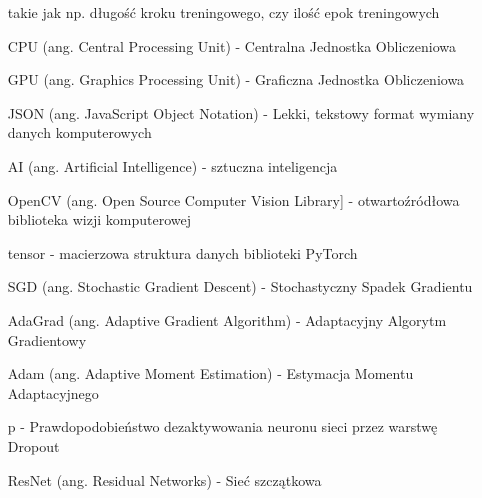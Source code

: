 \begin{itemize}
    takie jak np. długość kroku treningowego, czy ilość epok treningowych
    \item[CPU] (ang. Central Processing Unit) - Centralna Jednostka Obliczeniowa
    \item[GPU] (ang. Graphics Processing Unit) - Graficzna Jednostka Obliczeniowa
    \item[JSON] (ang. JavaScript Object Notation) - Lekki, tekstowy format wymiany danych komputerowych
    \item[AI] (ang. Artificial Intelligence) - sztuczna inteligencja
    \item[OpenCV] (ang. Open Source Computer Vision Library] - otwartoźródłowa biblioteka wizji komputerowej
    \item[tensor] - macierzowa struktura danych biblioteki PyTorch
    \item[SGD] (ang. Stochastic Gradient Descent) - Stochastyczny Spadek Gradientu
    \item[AdaGrad] (ang. Adaptive Gradient Algorithm) - Adaptacyjny Algorytm Gradientowy
    \item[Adam] (ang. Adaptive Moment Estimation) - Estymacja Momentu Adaptacyjnego
    \item[p] - Prawdopodobieństwo dezaktywowania neuronu sieci przez warstwę Dropout
    \item[ResNet] (ang. Residual Networks) - Sieć szczątkowa


  \end{itemize}

